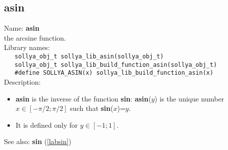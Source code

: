 \subsection{asin}
\label{labasin}
\noindent Name: \textbf{asin}\\
\phantom{aaa}the arcsine function.\\[0.2cm]
\noindent Library names:\\
\verb|   sollya_obj_t sollya_lib_asin(sollya_obj_t)|\\
\verb|   sollya_obj_t sollya_lib_build_function_asin(sollya_obj_t)|\\
\verb|   #define SOLLYA_ASIN(x) sollya_lib_build_function_asin(x)|\\[0.2cm]
\noindent Description: \begin{itemize}

\item \textbf{asin} is the inverse of the function \textbf{sin}: \textbf{asin}($y$) is the unique number 
   $x \in [-\pi/2; \pi/2]$ such that \textbf{sin}($x$)=$y$.

\item It is defined only for $y \in [-1;1]$.
\end{itemize}
See also: \textbf{sin} (\ref{labsin})
